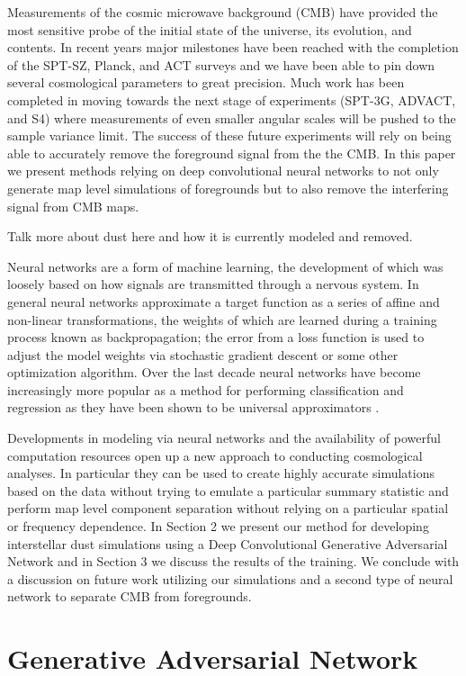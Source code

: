 \documentclass[twocolumn]{aastex62}
\begin{document}
Measurements of the cosmic microwave background (CMB) have provided the most sensitive probe of the initial state of the universe, its evolution, and contents. In recent years major milestones have been reached with the completion of the SPT-SZ, Planck, and ACT surveys and we have been able to pin down several cosmological parameters to great precision. Much work has been completed in moving towards the next stage of experiments (SPT-3G, ADVACT, and S4) where measurements of even smaller angular scales will be pushed to the sample variance limit. The success of these future experiments will rely on being able to accurately remove the foreground signal from the the CMB. In this paper we present methods relying on deep convolutional neural networks to not only generate map level simulations of foregrounds but to also remove the interfering signal from CMB maps.

Talk more about dust here and how it is currently modeled and removed.

Neural networks are a form of machine learning, the development of which was loosely based on how signals are transmitted through a nervous system. In general neural networks approximate a target function as a series of affine and non-linear transformations, the weights of which are learned during a training process known as backpropagation; the error from a loss function is used to adjust the model weights via stochastic gradient descent or some other optimization algorithm. Over the last decade neural networks have become increasingly more popular as a method for performing classification and regression as they have been shown to be universal approximators \citep{csaji01}. 

Developments in modeling via neural networks and the availability of powerful computation resources open up a new approach to conducting cosmological analyses. In particular they can be used to create highly accurate simulations based on the data without trying to emulate a particular summary statistic and perform map level component separation without relying on a particular spatial or frequency dependence.  In Section 2 we present our method for developing interstellar dust simulations using a Deep Convolutional Generative Adversarial Network and in Section 3 we discuss the results of the training. We conclude with a discussion on future work utilizing our simulations and a second type of neural network to separate CMB from foregrounds.


\section{Generative Adversarial Network}
\end{document}
